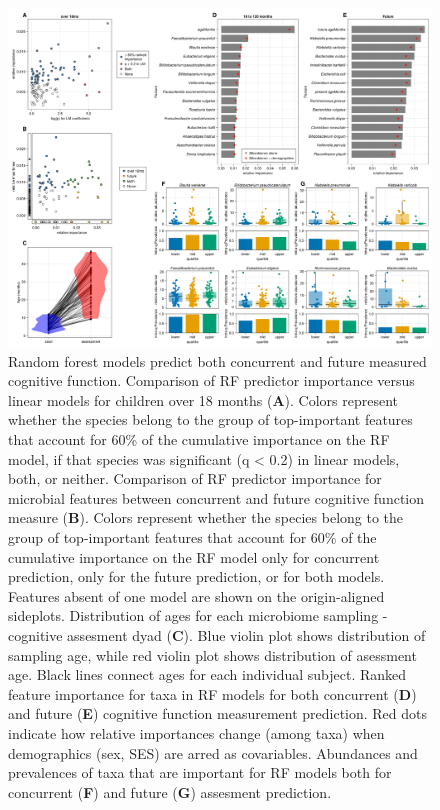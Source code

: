 \documentclass{article}
\begin{document}
\begin{figure}
    \centering
    \includegraphics[width=\textwidth]{assets/Figure3.png}
    \caption{
        Random forest models predict both concurrent and future measured cognitive function.
        Comparison of RF predictor importance versus linear models for children
        over 18 months (\textbf{A}).
        Colors represent whether the species belong to the group of
        top-important features that account for 60\% of the cumulative
        importance on the RF model, if that species was significant (q
        \textless{} 0.2) in linear models, both, or neither.
        Comparison of RF predictor importance for microbial features
        between concurrent and future cognitive function measure
        (\textbf{B}).
        Colors represent whether the species belong to the group of
        top-important features that account for 60\% of the cumulative
        importance on the RF model only for concurrent prediction,
        only for the future prediction, or for both models.
        Features absent of one model are shown on the origin-aligned sideplots.
        Distribution of ages for each microbiome sampling - cognitive assesment dyad (\textbf{C}).
        Blue violin plot shows distribution of sampling age,
        while red violin plot shows distribution of asessment age.
        Black lines connect ages for each individual subject.      
        Ranked feature importance for taxa in RF models for
        both concurrent (\textbf{D}) and future (\textbf{E})
        cognitive function measurement prediction.
        Red dots indicate how relative importances change (among taxa)
        when demographics (sex, SES) are arred as covariables.
        Abundances and prevalences of taxa that are important
        for RF models both for concurrent (\textbf{F}) and future (\textbf{G}) assesment prediction.
        }
    \label{fig:3}
\end{figure}
\end{document}

